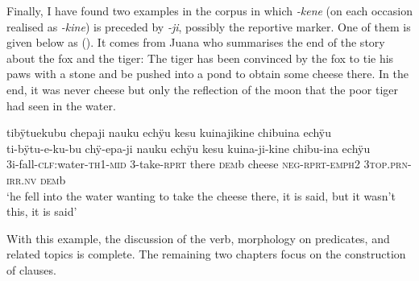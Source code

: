 Finally, I have found two examples in the corpus in which \textit{-kene} (on each occasion realised as \textit{-kine}) is preceded by \textit{-ji}, possibly the reportive marker. One of them is given below as (). It comes from Juana who summarises the end of the story about the fox and the tiger: The tiger has been convinced by the fox to tie his paws with a stone and be pushed into a pond to obtain some cheese there. In the end, it was never cheese but only the reflection of the moon that the poor tiger had seen in the water.

\newpage

\ea\label{ex:jikine}
\begingl
\glpreamble tibÿtuekubu chepaji nauku echÿu kesu kuinajikine chibuina echÿu\\
\gla ti-bÿtu-e-ku-bu chÿ-epa-ji nauku echÿu kesu kuina-ji-kine chibu-ina echÿu\\
\glb 3i-fall-\textsc{clf:}water-\textsc{th}1-\textsc{mid} 3-take-\textsc{rprt} there \textsc{dem}b cheese \textsc{neg}-\textsc{rprt}-\textsc{emph}2 3\textsc{top.prn}-\textsc{irr.nv} \textsc{dem}b\\
\glft ‘he fell into the water wanting to take the cheese there, it is said, but it wasn’t this, it is said’
\endgl
\trailingcitation{[jmx-n120429ls-x5.263]}
\xe


With this example, the discussion of the verb, morphology on predicates, and related topics is complete. The remaining two chapters focus on the construction of clauses.





